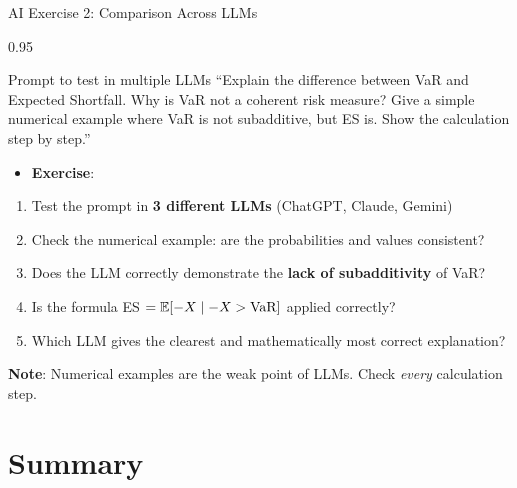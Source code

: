 \documentclass[9pt, aspectratio=169, t]{beamer}
\begin{document}
\begin{frame}{AI Exercise 2: Comparison Across LLMs}
\begin{cminipage}{0.95\textwidth}
    \vspace{-3mm}
    \begin{block}{\footnotesize Prompt to test in multiple LLMs}
        {\footnotesize
        ``Explain the difference between VaR and Expected Shortfall. Why is VaR not a coherent risk measure? Give a simple numerical example where VaR is not subadditive, but ES is. Show the calculation step by step.''
        }
    \end{block}
    \vspace{-2mm}
    {\footnotesize
    \begin{itemize}\setlength{\itemsep}{0pt}
        \item \textbf{Exercise}:
    \end{itemize}
    \begin{enumerate}\setlength{\itemsep}{0pt}
        \item Test the prompt in \textbf{3 different LLMs} (ChatGPT, Claude, Gemini)
        \item Check the numerical example: are the probabilities and values consistent?
        \item Does the LLM correctly demonstrate the \textbf{lack of subadditivity} of VaR?
        \item Is the formula ES $= \mathbb{E}[-X \mid -X > \text{VaR}]$ applied correctly?
        \item Which LLM gives the clearest and mathematically most correct explanation?
    \end{enumerate}
    }
    \vspace{-2mm}
    \begin{alertblock}{}
        {\footnotesize \textbf{Note}: Numerical examples are the weak point of LLMs. Check \textit{every} calculation step.}
    \end{alertblock}
\end{cminipage}
\end{frame}

\section{Summary}
\end{document}
